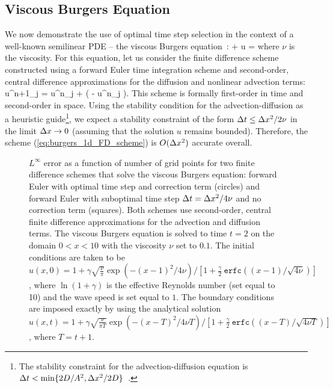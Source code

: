 \documentclass[fleqn,12pt,twoside]{article}
\begin{document}
\subsection{Viscous Burgers Equation}
We now demonstrate the use of optimal time step selection in the context of 
a well-known semilinear PDE -- the viscous Burgers 
equation~\cite{whitham_book}:
\beq
   + u  = 
     \nu {} 
  \label{eq:burgers_1d}
\eeq
where $\nu$ is the viscosity.  For this equation, let us consider the finite
difference scheme constructed using a forward Euler time integration scheme
and second-order, central difference approximations for the diffusion and 
nonlinear advection terms:
\beq
  u^{n+1}_j = u^{n}_j 
  + \dt 
    \left( \nu 
         - u^n_j 
    \right).
  \label{eq:burgers_1d_FD_scheme}
\eeq
This scheme is formally first-order in time and second-order in space.  
Using the stability condition for the advection-diffusion as a heuristic 
guide\footnote{The stability constraint for the advection-diffusion equation
is $\Delta t < \min \{2D/A^2, \Delta x^2/2D \}$~\cite{chan_1984}.}, 
we expect a stability constraint of the form $\Delta t \le \Delta x^2/2 \nu$ in the 
limit $\Delta x \rightarrow 0$ (assuming that the solution $u$ remains bounded).  
Therefore, the scheme (\ref{eq:burgers_1d_FD_scheme}) is $O(\Delta x^2)$ accurate 
overall. 

\begin{figure}[tb]
\begin{center}
\caption{$L^\infty$ error as a function of number of grid points for
two finite difference schemes that solve the viscous Burgers equation:
forward Euler with optimal time step and correction term (circles)
and forward Euler with suboptimal time step $\Delta t = \Delta x^2/4\nu$ and no 
correction term (squares).
Both schemes use second-order, central finite difference approximations for
the advection and diffusion terms.
The viscous Burgers equation is solved to time $t=2$ on the domain 
$0 < x < 10$ with the viscosity $\nu$ set to $0.1$.  The initial conditions are 
taken to be 
$u(x,0) = 1 + \gamma \sqrt{\frac{\nu}{\pi}} \exp\left( -(x-1)^2/4 \nu \right) 
            / \left[ 1 + \frac{\gamma}{2} \ 
                         \mathtt{erfc}\left((x-1)/\sqrt{4\nu} \right) 
    \right]$,
where $\ln(1+\gamma)$ is the effective Reynolds number (set equal to 10) and 
the wave speed is set equal to $1$.  The boundary conditions are imposed 
exactly by using
the analytical solution
$u(x,t) = 1 + \gamma \sqrt{\frac{\nu}{\pi T}} 
              \exp\left( -(x-T)^2/4 \nu T \right) 
            / \left[ 1 + \frac{\gamma}{2} \ 
                         \mathtt{erfc}\left((x-T)/\sqrt{4\nu T} \right) 
    \right]$,
where $T = t+1$.
}
\label{fig:burgers_1d_error}
\end{center}
\end{figure}
\end{document}
